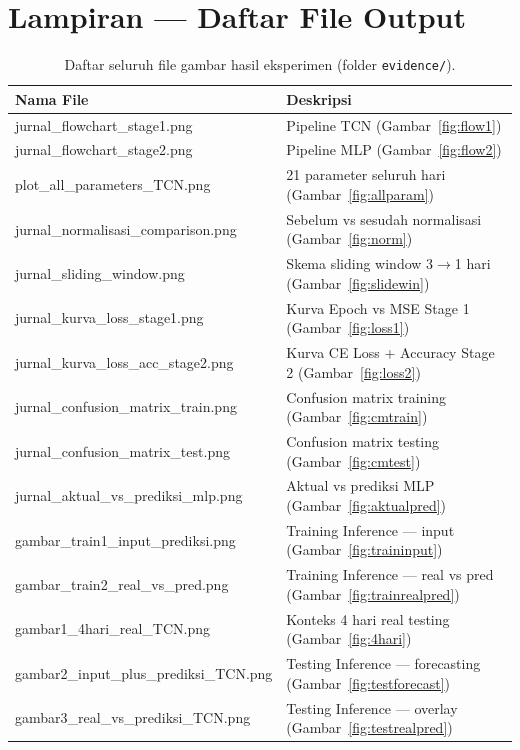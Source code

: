\documentclass[11pt,a4paper]{article}
\begin{document}
\newpage
\section{Lampiran — Daftar File Output}

\begin{table}[H]
    \centering
    \small
    \caption{Daftar seluruh file gambar hasil eksperimen (folder \texttt{evidence/}).}
    \begin{tabular}{ll}
        \toprule
        \textbf{Nama File} & \textbf{Deskripsi} \\
        \midrule
        jurnal\_flowchart\_stage1.png & Pipeline TCN (Gambar~\ref{fig:flow1}) \\
        jurnal\_flowchart\_stage2.png & Pipeline MLP (Gambar~\ref{fig:flow2}) \\
        plot\_all\_parameters\_TCN.png & 21 parameter seluruh hari (Gambar~\ref{fig:allparam}) \\
        jurnal\_normalisasi\_comparison.png & Sebelum vs sesudah normalisasi (Gambar~\ref{fig:norm}) \\
        jurnal\_sliding\_window.png & Skema sliding window 3$\to$1 hari (Gambar~\ref{fig:slidewin}) \\
        jurnal\_kurva\_loss\_stage1.png & Kurva Epoch vs MSE Stage 1 (Gambar~\ref{fig:loss1}) \\
        jurnal\_kurva\_loss\_acc\_stage2.png & Kurva CE Loss + Accuracy Stage 2 (Gambar~\ref{fig:loss2}) \\
        jurnal\_confusion\_matrix\_train.png & Confusion matrix training (Gambar~\ref{fig:cmtrain}) \\
        jurnal\_confusion\_matrix\_test.png & Confusion matrix testing (Gambar~\ref{fig:cmtest}) \\
        jurnal\_aktual\_vs\_prediksi\_mlp.png & Aktual vs prediksi MLP (Gambar~\ref{fig:aktualpred}) \\
        gambar\_train1\_input\_prediksi.png & Training Inference — input (Gambar~\ref{fig:traininput}) \\
        gambar\_train2\_real\_vs\_pred.png & Training Inference — real vs pred (Gambar~\ref{fig:trainrealpred}) \\
        gambar1\_4hari\_real\_TCN.png & Konteks 4 hari real testing (Gambar~\ref{fig:4hari}) \\
        gambar2\_input\_plus\_prediksi\_TCN.png & Testing Inference — forecasting (Gambar~\ref{fig:testforecast}) \\
        gambar3\_real\_vs\_prediksi\_TCN.png & Testing Inference — overlay (Gambar~\ref{fig:testrealpred}) \\
        \bottomrule
    \end{tabular}
\end{table}
\end{document}
